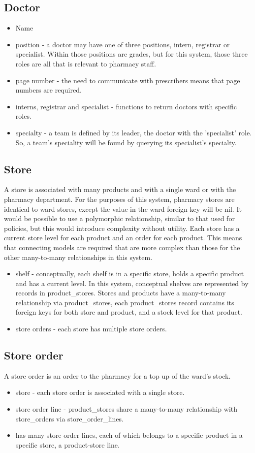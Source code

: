 \documentclass[letterpaper]{amsart}
\begin{document}
\subsection{Doctor}
\begin{itemize}
    \item Name 
    \item position - a doctor may have one of three positions, intern, registrar or specialist.  Within those positions are grades, but for this system, those three roles are all that is relevant to pharmacy staff. 
    \item page number - the need to communicate with prescribers means that page numbers are required. 
    \item interns, registrar and specialist - functions to return doctors with specific roles.
    \item specialty - a team is defined by its leader, the doctor with the 'specialist' role.  So, a team's speciality will be found by querying its specialist's specialty.
\end{itemize}
\subsection{Store}
A store is associated with many products and with a single ward or with the pharmacy department.  For the purposes of this system, pharmacy stores are identical to ward stores, except the value in the ward foreign key will be nil.  It would be possible to use a polymorphic relationship, similar to that used for policies, but this would introduce complexity without utility.  Each store has a current store level for each product and an order for each product.  This means that connecting models are required that are more complex than those for the other many-to-many relationships in this system.
\begin{itemize} 
    \item shelf - conceptually, each shelf is in a specific store, holds a specific product and has a current level.  In this system, conceptual shelves are represented by records in product\_stores.  Stores and products have a many-to-many relationship via product\_stores, each product\_stores record contains its foreign keys for both store and product, and a stock level for that product.
    \item store orders - each store has multiple store orders.
\end{itemize}
\subsection{Store order}
A store order is an order to the pharmacy for a top up of the ward's stock.
\begin{itemize}
    \item store - each store order is associated with a single store.
    \item store order line - product\_stores share a many-to-many relationship with store\_orders via store\_order\_lines.
    \item has many store order lines, each of which belongs to a specific product in a specific store, a product-store line.
\end{itemize}
\end{document}
